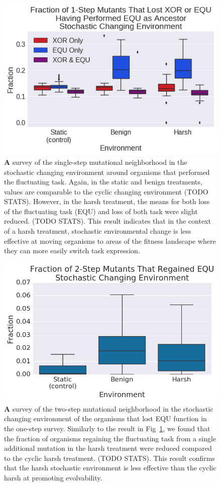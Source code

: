 \documentclass[PhD]{msu-thesis}
\begin{document}
\begin{figure}[!h] %
\includegraphics[trim={0.2cm 0 0 0.2cm},clip,width=0.75\columnwidth]{figures/CE/CSE_frac_1step__filtered__box.png}
\caption{{\textbf A survey of the single-step mutational neighborhood} in the stochastic changing environment around organisms that performed the fluctuating task. Again, in the static and benign treatments, values are comparable to the cyclic changing environment (TODO STATS). However, in the harsh treatment, the means for both loss of the fluctuating task (EQU) and loss of both task were slight reduced. (TODO STATS). This result indicates that in the context of a harsh treatment, stochastic environmental change is less effective at moving organisms to areas of the fitness landscape where they can more easily switch task expression. %
}\label{fig:CSE_single_step}
\end{figure}
\begin{figure}[!h] %
\includegraphics[trim={0.2cm 0 0.4cm 0.25cm},clip,width=0.75\columnwidth]{figures/CE/CSE_frac_2step__box.png}
\caption{{\textbf A survey of the two-step mutational neighborhood} in the stochastic changing environment of the organisms that lost EQU function in the one-step survey. Similarly to the result in Fig~\ref{fig:CSE_single_step}, we found that the fraction of organisms regaining the fluctuating task from a single additional mutation in the harsh treatment were reduced compared to the cyclic harsh treatment. (TODO STATS). This result confirms that the harsh stochastic environment is less effective than the cyclic harsh at promoting evolvability.
}\label{fig:CSE_two_step}
\end{figure}
\end{document}
